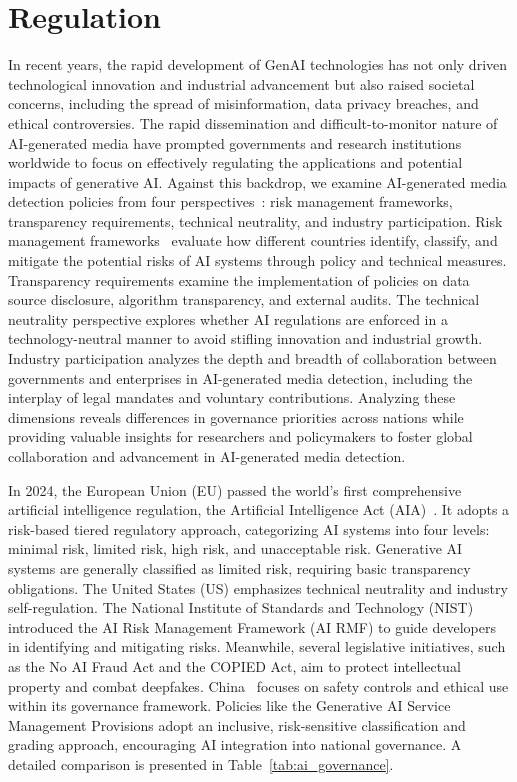 \section{Regulation}
\label{sec:reg}


In recent years, the rapid development of GenAI technologies has not only driven technological innovation and industrial advancement but also raised societal concerns, including the spread of misinformation, data privacy breaches, and ethical controversies. The rapid dissemination and difficult-to-monitor nature of AI-generated media have prompted governments and research institutions worldwide to focus on effectively regulating the applications and potential impacts of generative AI. Against this backdrop, we examine AI-generated media detection policies from four perspectives~\cite{shi2024large}: risk management frameworks, transparency requirements, technical neutrality, and industry participation. Risk management frameworks~\cite{novelli2024taking, zeng2024ai} evaluate how different countries identify, classify, and mitigate the potential risks of AI systems through policy and technical measures. Transparency requirements examine the implementation of policies on data source disclosure, algorithm transparency, and external audits.
The technical neutrality perspective explores whether AI regulations are enforced in a technology-neutral manner to avoid stifling innovation and industrial growth.
Industry participation analyzes the depth and breadth of collaboration between governments and enterprises in AI-generated media detection, including the interplay of legal mandates and voluntary contributions.
Analyzing these dimensions reveals differences in governance priorities across nations while providing valuable insights for researchers and policymakers to foster global collaboration and advancement in AI-generated media detection.

In 2024, the European Union (EU) passed the world’s first comprehensive artificial intelligence regulation, the Artificial Intelligence Act (AIA)~\cite{ArtificialIntelligenceAct}. It adopts a risk-based tiered regulatory approach, categorizing AI systems into four levels: minimal risk, limited risk, high risk, and unacceptable risk. Generative AI systems are generally classified as limited risk, requiring basic transparency obligations. The United States (US) emphasizes technical neutrality and industry self-regulation. The National Institute of Standards and Technology (NIST) introduced the AI Risk Management Framework (AI RMF) to guide developers in identifying and mitigating risks. Meanwhile, several legislative initiatives, such as the No AI Fraud Act and the COPIED Act, aim to protect intellectual property and combat deepfakes. China~\cite{ChinaAIGovernance2023} focuses on safety controls and ethical use within its governance framework. Policies like the Generative AI Service Management Provisions adopt an inclusive, risk-sensitive classification and grading approach, encouraging AI integration into national governance. A detailed comparison is presented in Table~\ref{tab:ai_governance}.

